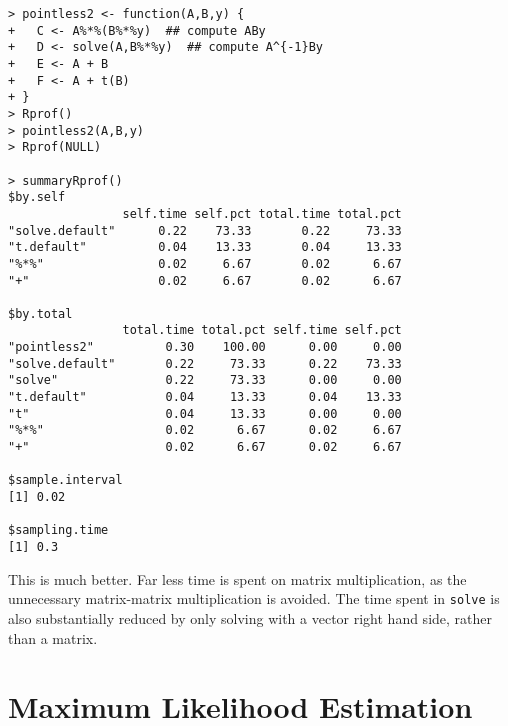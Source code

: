 \documentclass[10pt] {article}
\theoremstyle{definition}
\begin{document}
{\small \begin{verbatim}
> pointless2 <- function(A,B,y) { 
+   C <- A%*%(B%*%y)  ## compute ABy
+   D <- solve(A,B%*%y)  ## compute A^{-1}By
+   E <- A + B
+   F <- A + t(B)
+ }
> Rprof()
> pointless2(A,B,y)
> Rprof(NULL)

> summaryRprof()
$by.self
                self.time self.pct total.time total.pct
"solve.default"      0.22    73.33       0.22     73.33
"t.default"          0.04    13.33       0.04     13.33
"%*%"                0.02     6.67       0.02      6.67
"+"                  0.02     6.67       0.02      6.67

$by.total
                total.time total.pct self.time self.pct
"pointless2"          0.30    100.00      0.00     0.00
"solve.default"       0.22     73.33      0.22    73.33
"solve"               0.22     73.33      0.00     0.00
"t.default"           0.04     13.33      0.04    13.33
"t"                   0.04     13.33      0.00     0.00
"%*%"                 0.02      6.67      0.02     6.67
"+"                   0.02      6.67      0.02     6.67

$sample.interval
[1] 0.02

$sampling.time
[1] 0.3
\end{verbatim}}
This is much better. Far less time is spent on matrix multiplication, as the unnecessary matrix-matrix multiplication is avoided. The time spent in {\tt solve} is also substantially reduced by only solving with a vector right hand side, rather than a matrix. 

\section{Maximum Likelihood Estimation \label{sec:mle}}
\end{document}
